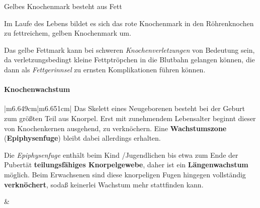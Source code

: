 \documentclass{article}
\newcommand\gEs[1]{\textbf{\textcolor[rgb]{0.0,0.0,0.5019608}{#1}}}
\newcommand\gEs[1]{\textbf{\textcolor[rgb]{0.0,0.0,0.5019608}{#1}}}
\newcommand\gT[1]{\textbf{\textup{\textcolor[rgb]{0.0,0.5019608,0.0}{#1}}}}
\newcommand\gE[1]{\textit{#1}}
\begin{document}
{\mdseries\color{black}
\textcolor[rgb]{1.0,0.70980394,0.08235294}{Gelbes} Knochenmark besteht
aus Fett }

{\mdseries
Im Laufe des Lebens bildet es sich das rote Knochenmark in den
R\"ohrenknochen zu fettreichem, gelben Knochenmark um. }

{\mdseries
Das gelbe Fettmark kann bei schweren
\gE{Knochenverletzungen} von Bedeutung sein, da
verletzungs\-bedingt kleine Fettptr\"opchen in die Blutbahn gelangen
k\"onnen, die dann als \gE{Fettgerinnsel}  zu ernsten
Komplikationen f\"uhren k\"onnen. }

\paragraph{Knochenwachstum}
\begin{center}
\tablehead{}\begin{supertabular}{|m{6.649cm}|m{6.651cm}|}
\hline
Das Skelett eines Neugeborenen besteht bei der Geburt zum gr\"o{\ss}ten
Teil aus Knorpel. Erst mit zunehmendem Lebensalter beginnt dieser von
Knochenkernen ausgehend, zu verkn\"ochern. Eine
\gEs{Wachstumszone}
(\gT{Epiphysenfuge}) bleibt dabei
allerdings erhalten.

{\mdseries Die \textit{Epiphysenfuge} enth\"alt beim Kind /Jugendlichen
bis etwa zum Ende der Pubert\"at
\gEs{teilungsf\"ahiges Knorpelgewebe}, daher ist ein
\gEs{L\"angenwachstum} m\"oglich. Beim Erwachsenen
sind diese knorpeligen Fugen hingegen vollst\"andig
\gEs{verkn\"ochert}, soda{\ss} keinerlei Wachstum
mehr stattfinden kann.}

 &
{%
 \par}

\\\hline
\end{supertabular}
\end{center}
\end{document}
